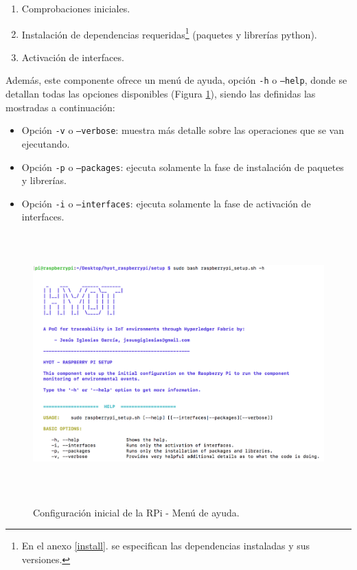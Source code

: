 \documentclass[12pt,a4paper, twoside]{report}
\begin{document}
	\begin{enumerate}
		\item Comprobaciones iniciales.
		\item Instalación de dependencias requeridas\footnote{En el anexo \ref{install}.  se especifican las dependencias instaladas y sus versiones.} (paquetes y librerías \gls{python}).
		\item Activación de interfaces.
	\end{enumerate}
	
	Además, este componente ofrece un menú de ayuda, opción \texttt{-h} o \texttt{--help}, donde se detallan todas las opciones disponibles (Figura \ref{fig:userguide_setup_help}), siendo las definidas las mostradas a continuación:
	
	\begin{itemize}
		\item Opción \texttt{-v} o \texttt{--verbose}: muestra más detalle sobre las operaciones que se van ejecutando.
		\item Opción \texttt{-p} o \texttt{--packages}: ejecuta solamente la fase de instalación de paquetes y librerías.
		\item Opción \texttt{-i} o \texttt{--interfaces}: ejecuta solamente la fase de activación de interfaces.
	\end{itemize}

	\begin{figure}[!ht]   
		\caption{Configuración inicial de la RPi - Menú de ayuda.} 
		\begin{center} 
			\includegraphics[width=16cm,height=10cm]{Images/userGuide/setup/help} \\
			\label{fig:userguide_setup_help} 
		\end{center}  
	\end{figure}
\end{document}
